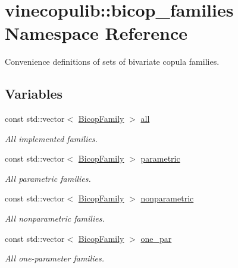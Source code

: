 \hypertarget{namespacevinecopulib_1_1bicop__families}{\section{vinecopulib\+:\+:bicop\+\_\+families Namespace Reference}
\label{namespacevinecopulib_1_1bicop__families}
}


Convenience definitions of sets of bivariate copula families.  


\subsection*{Variables}
\begin{DoxyCompactItemize}
\item 
const std\+::vector$<$ \hyperlink{namespacevinecopulib_a42e95cc06d33896199caab0c11ad44f3}{Bicop\+Family} $>$ \hyperlink{namespacevinecopulib_1_1bicop__families_a5214a513f41ec23b74782aab96ea6774}{all}
\begin{DoxyCompactList}\small\item\em All implemented families. \end{DoxyCompactList}\item 
const std\+::vector$<$ \hyperlink{namespacevinecopulib_a42e95cc06d33896199caab0c11ad44f3}{Bicop\+Family} $>$ \hyperlink{namespacevinecopulib_1_1bicop__families_a76d66bb6cb03ae4de1cef3d1ed70ac16}{parametric}
\begin{DoxyCompactList}\small\item\em All parametric families. \end{DoxyCompactList}\item 
const std\+::vector$<$ \hyperlink{namespacevinecopulib_a42e95cc06d33896199caab0c11ad44f3}{Bicop\+Family} $>$ \hyperlink{namespacevinecopulib_1_1bicop__families_a01c7c990cc34b1b74d115858a52fcdc5}{nonparametric}
\begin{DoxyCompactList}\small\item\em All nonparametric families. \end{DoxyCompactList}\item 
const std\+::vector$<$ \hyperlink{namespacevinecopulib_a42e95cc06d33896199caab0c11ad44f3}{Bicop\+Family} $>$ \hyperlink{namespacevinecopulib_1_1bicop__families_aba503484b0a13cfb0e67c026e2f295d4}{one\+\_\+par}
\begin{DoxyCompactList}\small\item\em All one-\/parameter families. \end{DoxyCompactList}\item 

\end{DoxyCompactItemize}
